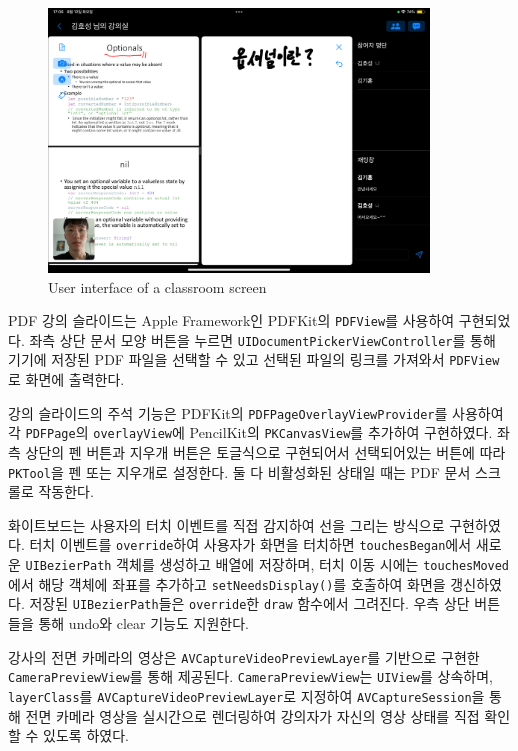 \documentclass[pdflatex,sn-mathphys-num]{sn-jnl}%
\theoremstyle{thmstyleone}%
\theoremstyle{thmstyletwo}%
\theoremstyle{thmstylethree}%
\begin{document}
\begin{figure}[H]
\centering
\includegraphics[width=0.9\textwidth]{room0.PNG}
\caption{User interface of a classroom screen}\label{fig4}
\end{figure}

\noindent
PDF 강의 슬라이드는 Apple Framework인 PDFKit\cite{PDFKit}의 \verb+PDFView+를 사용하여 구현되었다. 좌측 상단 문서 모양 버튼을 누르면 \verb+UIDocumentPickerViewController+를 통해 기기에 저장된 PDF 파일을 선택할 수 있고 선택된 파일의 링크를 가져와서 \verb+PDFView+로 화면에 출력한다.

강의 슬라이드의 주석 기능은 PDFKit의 \verb+PDFPageOverlayViewProvider+를 사용하여 각 \verb+PDFPage+의 \verb+overlayView+에 PencilKit\cite{PencilKit}의 \verb+PKCanvasView+를 추가하여 구현하였다. 좌측 상단의 펜 버튼과 지우개 버튼은 토글식으로 구현되어서 선택되어있는 버튼에 따라 \verb+PKTool+을 펜 또는 지우개로 설정한다. 둘 다 비활성화된 상태일 때는 PDF 문서 스크롤로 작동한다.

화이트보드는 사용자의 터치 이벤트를 직접 감지하여 선을 그리는 방식으로 구현하였다. 터치 이벤트를 \verb+override+하여 사용자가 화면을 터치하면 \verb+touchesBegan+에서 새로운 \verb+UIBezierPath+ 객체를 생성하고 배열에 저장하며, 터치 이동 시에는 \verb+touchesMoved+에서 해당 객체에 좌표를 추가하고 \verb+setNeedsDisplay()+를 호출하여 화면을 갱신하였다. 저장된 \verb+UIBezierPath+들은 \verb+override+한 \verb+draw+ 함수에서 그려진다. 우측 상단 버튼들을 통해 undo와 clear 기능도 지원한다.

강사의 전면 카메라의 영상은 \verb+AVCaptureVideoPreviewLayer+를 기반으로 구현한 \verb+CameraPreviewView+를 통해 제공된다. \verb+CameraPreviewView+는 \verb+UIView+를 상속하며, \verb+layerClass+를 \verb+AVCaptureVideoPreviewLayer+로 지정하여 \verb+AVCaptureSession+을 통해 전면 카메라 영상을 실시간으로 렌더링하여 강의자가 자신의 영상 상태를 직접 확인할 수 있도록 하였다.
\end{document}
